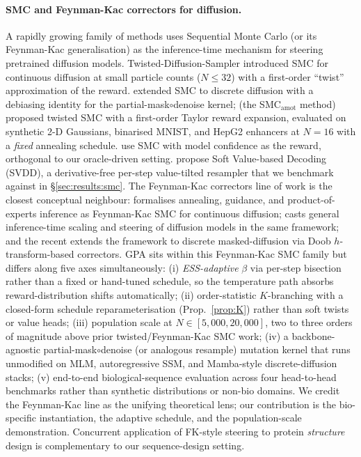 \documentclass{article}
\theoremstyle{definition}
\theoremstyle{remark}
\newcommand{\gpa}{\textsc{GPA}\xspace}
\newcommand{\svdd}{\textsc{SVDD}\xspace}
\begin{document}
\paragraph{SMC and Feynman-Kac correctors for diffusion.}
A rapidly growing family of methods uses Sequential Monte Carlo (or its Feynman-Kac generalisation) as the inference-time mechanism for steering pretrained diffusion models. Twisted-Diffusion-Sampler \citep{tds2023} introduced SMC for continuous diffusion at small particle counts ($N\!\leq\!32$) with a first-order ``twist'' approximation of the reward. \citet{lee2025debiasing} extended SMC to discrete diffusion with a debiasing identity for the partial-mask$\circ$denoise kernel; \citet{paniouli2025} (the SMC$_{\text{amot}}$ method) proposed twisted SMC with a first-order Taylor reward expansion, evaluated on synthetic 2-D Gaussians, binarised MNIST, and HepG2 enhancers at $N\!=\!16$ with a \emph{fixed} annealing schedule. \citet{selfrewarding2026} use SMC with model confidence as the reward, orthogonal to our oracle-driven setting. \citet{li2024svdd} propose Soft Value-based Decoding (\svdd{}), a derivative-free per-step value-tilted resampler that we benchmark against in \S\ref{sec:results:smc}. The Feynman-Kac correctors line of work is the closest conceptual neighbour: \citet{skreta2025fk} formalises annealing, guidance, and product-of-experts inference as Feynman-Kac SMC for continuous diffusion; \citet{singhal2025fkst} casts general inference-time scaling and steering of diffusion models in the same framework; and the recent \citet{skreta2026discretefk} extends the framework to discrete masked-diffusion via Doob $h$-transform-based correctors. \gpa{} sits within this Feynman-Kac SMC family but differs along five axes simultaneously: (i) \emph{ESS-adaptive} $\beta$ via per-step bisection \citep{liuchen1995,delmoral2012adaptive} rather than a fixed or hand-tuned schedule, so the temperature path absorbs reward-distribution shifts automatically; (ii) order-statistic $K$-branching with a closed-form schedule reparameterisation (Prop.~\ref{prop:K}) rather than soft twists or value heads; (iii) population scale at $N\!\in\![5{,}000,20{,}000]$, two to three orders of magnitude above prior twisted/Feynman-Kac SMC work; (iv) a backbone-agnostic partial-mask$\circ$denoise (or analogous resample) mutation kernel that runs unmodified on MLM, autoregressive SSM, and Mamba-style discrete-diffusion stacks; (v) end-to-end biological-sequence evaluation across four head-to-head benchmarks rather than synthetic distributions or non-bio domains. We credit the Feynman-Kac line as the unifying theoretical lens; our contribution is the bio-specific instantiation, the adaptive schedule, and the population-scale demonstration. Concurrent application of FK-style steering to protein \emph{structure} design \citep{hartman2025fkprotein} is complementary to our sequence-design setting.
\end{document}
